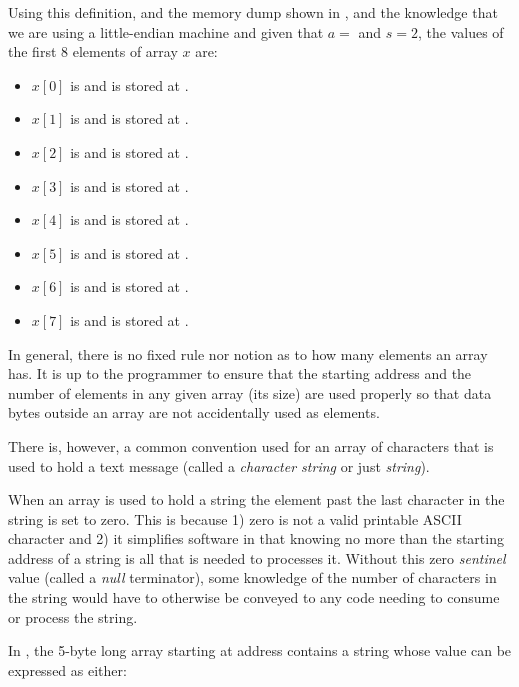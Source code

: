 Using this definition, and the memory dump shown in 
, and the knowledge that 
we are using a little-endian machine and given that
$a = $  and $s = 2$, the values of the first 8 elements 
of array $x$ are:

\begin{itemize}
\item $x[0]$ is  and is stored at .
\item $x[1]$ is  and is stored at .
\item $x[2]$ is  and is stored at .
\item $x[3]$ is  and is stored at .
\item $x[4]$ is  and is stored at .
\item $x[5]$ is  and is stored at .
\item $x[6]$ is  and is stored at .
\item $x[7]$ is  and is stored at .
\end{itemize}

\begin{tcolorbox}
In general, there is no fixed rule nor notion as to how many 
elements an array has.  It is up to the programmer to ensure that
the starting address and the number of elements in any given array
(its size) are used properly so that data bytes outside an array
are not accidentally used as elements.
\end{tcolorbox}

There is, however, a common convention used for an array of 
characters that is used to hold a text message 
(called a {\em character string} or just {\em string}).

When an array is used to hold a string the element past the last
character in the string is set to zero.  This is because 1) zero 
is not a valid printable ASCII character and 2) it simplifies
software in that knowing no more than the starting address of a
string is all that is needed to processes it.  Without this zero
{\em sentinel} value (called a {\em null} terminator), some knowledge
of the number of characters in the string would have to otherwise 
be conveyed to any code needing to consume or process the string.

In , the 5-byte long array starting 
at address  contains a string whose value can be
expressed as either: %

